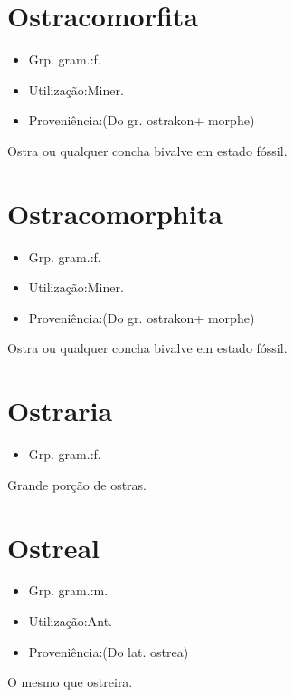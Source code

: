 \section{Ostracomorfita}
\begin{itemize}
\item {Grp. gram.:f.}
\end{itemize}
\begin{itemize}
\item {Utilização:Miner.}
\end{itemize}
\begin{itemize}
\item {Proveniência:(Do gr. \textunderscore ostrakon\textunderscore  + \textunderscore morphe\textunderscore )}
\end{itemize}
Ostra ou qualquer concha bivalve em estado fóssil.
\section{Ostracomorphita}
\begin{itemize}
\item {Grp. gram.:f.}
\end{itemize}
\begin{itemize}
\item {Utilização:Miner.}
\end{itemize}
\begin{itemize}
\item {Proveniência:(Do gr. \textunderscore ostrakon\textunderscore  + \textunderscore morphe\textunderscore )}
\end{itemize}
Ostra ou qualquer concha bivalve em estado fóssil.
\section{Ostraria}
\begin{itemize}
\item {Grp. gram.:f.}
\end{itemize}
Grande porção de ostras.
\section{Ostreal}
\begin{itemize}
\item {Grp. gram.:m.}
\end{itemize}
\begin{itemize}
\item {Utilização:Ant.}
\end{itemize}
\begin{itemize}
\item {Proveniência:(Do lat. \textunderscore ostrea\textunderscore )}
\end{itemize}
O mesmo que \textunderscore ostreira\textunderscore .
